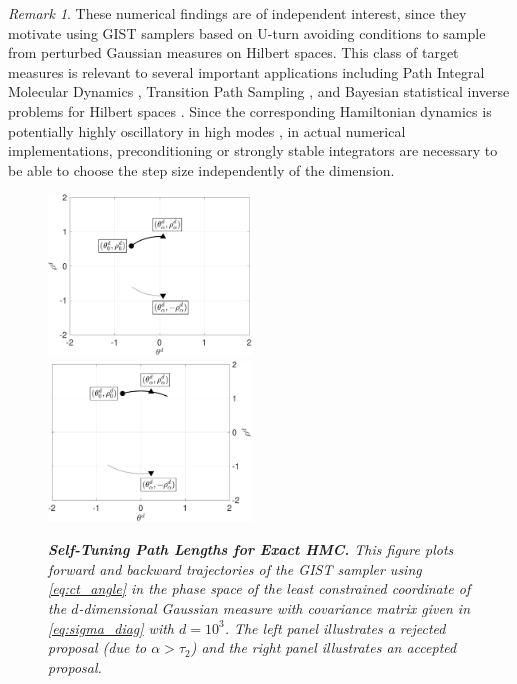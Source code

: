 \documentclass[letterpaper,11pt]{article}
\theoremstyle{plain}%
\theoremstyle{remark}
\newtheorem{remark}{Remark}
\begin{document}
\begin{remark}
These numerical findings are of independent interest, since they motivate using GIST samplers based on U-turn avoiding conditions to sample from perturbed Gaussian measures on Hilbert spaces.   This class of target measures is relevant to several important applications including Path Integral Molecular Dynamics \cite{ChandlerWolynes,
Miller2005a,
  Habershon2013,lu2020continuum}, Transition Path
Sampling  \cite{ReVa2005,pinski2010transition,bolhuis2002,Miller2007}, and Bayesian statistical inverse problems for Hilbert spaces \cite{kaipio2005statistical,stuart2010inverse,dashti2017bayesian,borggaard2018bayesian}. 
Since the corresponding Hamiltonian dynamics is potentially highly oscillatory in high modes \cite{petzold_jay_yen_1997}, in actual numerical implementations, preconditioning \cite{BoSaActaN2018} or strongly stable integrators \cite{Korol2020} are necessary to be able to choose the step size
independently of the dimension.  
\end{remark}


\begin{figure}[t]
    \centering
    \includegraphics[width=0.48\textwidth]{img/stHMC_angle_illustration_rejected.pdf} ~~~
    \includegraphics[width=0.48\textwidth]{img/stHMC_angle_illustration_accepted.pdf} 
        
    \caption{\it {\bfseries Self-Tuning Path Lengths for Exact HMC.} This figure plots forward and backward trajectories of the GIST sampler using \eqref{eq:ct_angle} in the phase space of the least constrained coordinate of the $d$-dimensional Gaussian measure with covariance matrix given in \eqref{eq:sigma_diag} with $d=10^3$.    The left panel illustrates a rejected proposal (due to $\alpha>\tau_2$) and the right panel illustrates an accepted proposal.}
    \label{fig:stHMC_illustration}
\end{figure}
\end{document}
